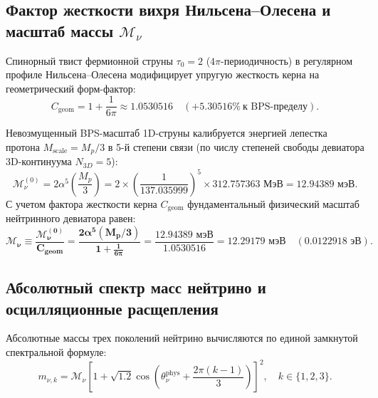 \documentclass[12pt,a4paper]{article}
\begin{document}
	\subsection{Фактор жесткости вихря Нильсена--Олесена и масштаб массы $\mathcal{M}_\nu$}
	Спинорный твист фермионной струны $\tau_0 = 2$ ($4\pi$-периодичность) в регулярном профиле Нильсена--Олесена модифицирует упругую жесткость керна на геометрический форм-фактор:
	\begin{equation}
		C_{\text{geom}} = 1 + \frac{1}{6\pi} \approx 1.0530516 \quad (\mathbf{+5.30516\%} \ \text{к BPS-пределу}).
	\end{equation}
	
	Невозмущенный BPS-масштаб 1D-струны калибруется энергией лепестка протона $M_{\text{scale}} = M_p/3$ в 5-й степени связи (по числу степеней свободы девиатора 3D-континуума $N_{3D}=5$):
	\begin{equation}
		\mathcal{M}_\nu^{(0)} = 2 \alpha^5 \left( \frac{M_p}{3} \right) = 2 \times \left(\frac{1}{137.035999}\right)^5 \times 312.757363 \text{ МэВ} = \mathbf{12.94389 \text{ мэВ}}.
	\end{equation}
	С учетом фактора жесткости керна $C_{\text{geom}}$ фундаментальный физический масштаб нейтринного девиатора равен:
	\begin{equation}
		\mathbf{\mathcal{M}_\nu \equiv \frac{\mathcal{M}_\nu^{(0)}}{C_{\text{geom}}} = \frac{2 \alpha^5 (M_p / 3)}{1 + \frac{1}{6\pi}} = \frac{12.94389 \text{ мэВ}}{1.0530516} = \mathbf{12.29179 \text{ мэВ}}} \quad (0.0122918 \text{ эВ}).
	\end{equation}
	
	\subsection{Абсолютный спектр масс нейтрино и осцилляционные расщепления}
	Абсолютные массы трех поколений нейтрино вычисляются по единой замкнутой спектральной формуле:
	\begin{equation}
		m_{\nu, k} = \mathcal{M}_\nu \left[ 1 + \sqrt{1.2} \cos\left( \theta_\nu^{\text{phys}} + \frac{2\pi(k-1)}{3} \right) \right]^2, \quad k \in \{1, 2, 3\}.
	\end{equation}
	
\end{document}
